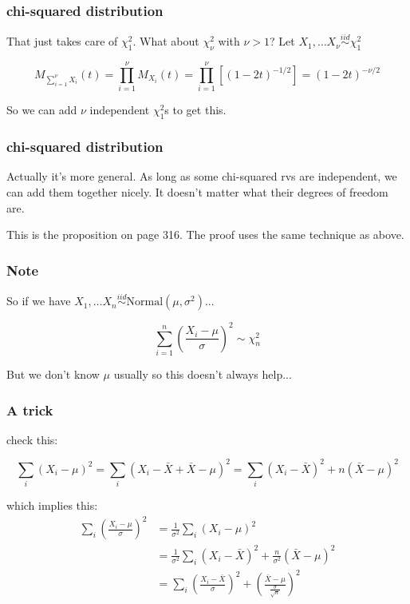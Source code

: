 \documentclass{beamer}
\begin{document}
\begin{frame}
\frametitle{chi-squared distribution}

That just takes care of $\chi_1^2$. What about $\chi_\nu^2$ with $\nu > 1$?  Let $X_1, \ldots X_\nu \overset{iid}{\sim} \chi^2_1$

\[
M_{\sum_{i=1}^{\nu} X_i }(t) =  \prod_{i=1}^{\nu} M_{X_i}(t) = \prod_{i=1}^{\nu} [(1 - 2t)^{- 1 / 2}] = (1 - 2t)^{- \nu / 2}
\]


So we can add $\nu$ independent $\chi^2_1$s to get this.

\end{frame}


\begin{frame}
\frametitle{chi-squared distribution}

Actually it's more general. As long as some chi-squared rvs are independent, we can add them together nicely. It doesn't matter what their degrees of freedom are. 
\newline

This is the proposition on page 316. The proof uses the same technique as above. 

\end{frame}


\begin{frame}
\frametitle{Note}

So if we have $X_1, \ldots X_n \overset{iid}{\sim} \text{Normal}(\mu, \sigma^2)$...

\[
\sum_{i=1}^n \left( \frac{X_i - \mu}{\sigma}\right)^2 \sim \chi^2_{n}
\]

But we don't know $\mu$ usually so this doesn't always help...
\end{frame}


\begin{frame}
\frametitle{A trick}

check this:

\[
\sum_i (X_i - \mu)^2 = \sum_i (X_i - \bar{X} + \bar{X} - \mu)^2 = \sum_i(X_i - \bar{X})^2 + n(\bar{X} - \mu)^2
\]

which implies this:
\begin{align*}
\sum_i \left( \frac{X_i - \mu}{\sigma} \right) ^2 &= \frac{1}{\sigma^2}\sum_i (X_i - \mu)^2 \\
&= \frac{1}{\sigma^2}\sum_i(X_i - \bar{X})^2 + \frac{n}{\sigma^2} (\bar{X} - \mu)^2 \\
&= \sum_i \left(\frac{X_i - \bar{X}}{\sigma} \right)^2 + \left( \frac{ \bar{X} - \mu }{ \frac{\sigma}{\sqrt{n}}  } \right)^2
\end{align*}

\end{frame}
\end{document}
